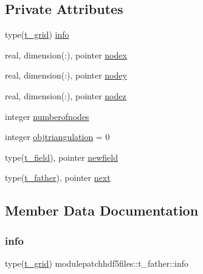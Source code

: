 \subsection*{Private Attributes}
\begin{DoxyCompactItemize}
\item 
type(\mbox{\hyperlink{structmodulepatchhdf5files_1_1t__grid}{t\+\_\+grid}}) \mbox{\hyperlink{structmodulepatchhdf5files_1_1t__father_a4c16debd8ffe51129f98a0d6fdd616e5}{info}}
\item 
real, dimension(\+:), pointer \mbox{\hyperlink{structmodulepatchhdf5files_1_1t__father_a455250c7608b8cd796a75026bbe78234}{nodex}}
\item 
real, dimension(\+:), pointer \mbox{\hyperlink{structmodulepatchhdf5files_1_1t__father_a6f3e6fd955ccd60b8d506f8e27a29f5b}{nodey}}
\item 
real, dimension(\+:), pointer \mbox{\hyperlink{structmodulepatchhdf5files_1_1t__father_a9edf23d025d07a2559fd15abc21dd06c}{nodez}}
\item 
integer \mbox{\hyperlink{structmodulepatchhdf5files_1_1t__father_adc9b27567cb34bcd590a4eb1ee20a731}{numberofnodes}}
\item 
integer \mbox{\hyperlink{structmodulepatchhdf5files_1_1t__father_aeabd2a0d68785a03ff75c1952bbc12be}{objtriangulation}} = 0
\item 
type(\mbox{\hyperlink{structmodulepatchhdf5files_1_1t__field}{t\+\_\+field}}), pointer \mbox{\hyperlink{structmodulepatchhdf5files_1_1t__father_a540b2917e53cd6b3d6ecbd23219fc7d2}{newfield}}
\item 
type(\mbox{\hyperlink{structmodulepatchhdf5files_1_1t__father}{t\+\_\+father}}), pointer \mbox{\hyperlink{structmodulepatchhdf5files_1_1t__father_a5a75c6de8538f8e1e675be9bf99433a8}{next}}
\end{DoxyCompactItemize}


\subsection{Member Data Documentation}
\mbox{\label{structmodulepatchhdf5files_1_1t__father_a4c16debd8ffe51129f98a0d6fdd616e5}} 
\subsubsection{\texorpdfstring{info}{info}}
{\footnotesize\ttfamily type(\mbox{\hyperlink{structmodulepatchhdf5files_1_1t__grid}{t\+\_\+grid}}) modulepatchhdf5files\+::t\+\_\+father\+::info\hspace{0.3cm}{\ttfamily [private]}}

